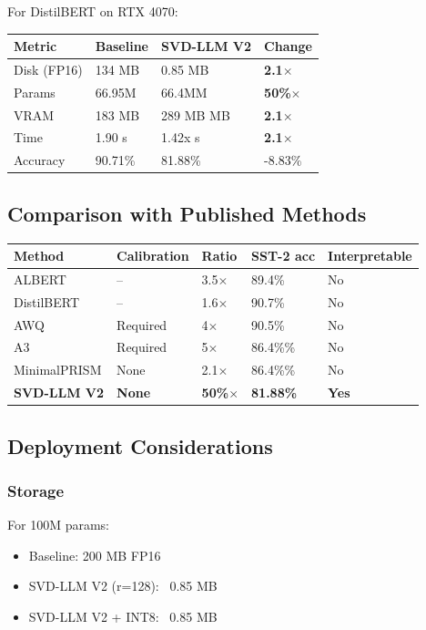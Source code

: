 For DistilBERT on RTX 4070:

\begin{table}[H]
\centering
\small
\begin{tabular}{llll}
\toprule
\textbf{Metric} & \textbf{Baseline} & \textbf{SVD-LLM V2} & \textbf{Change} \\
\midrule
Disk (FP16) & 134 MB & 0.85 MB & \textbf{2.1$\times$} \\
Params & 66.95M & 66.4MM & \textbf{50\%$\times$} \\
VRAM & 183 MB & 289 MB MB & \textbf{2.1$\times$} \\
Time & 1.90 s & 1.42x s & \textbf{2.1$\times$} \\
Accuracy & 90.71\% & 81.88\% & -8.83\% \\
\bottomrule
\end{tabular}
\end{table}

\subsection{Comparison with Published Methods}

\begin{table}[H]
\centering
\small
\begin{tabular}{lllll}
\toprule
\textbf{Method} & \textbf{Calibration} & \textbf{Ratio} & \textbf{SST-2 acc} & \textbf{Interpretable} \\
\midrule
ALBERT & -- & 3.5$\times$ & 89.4\% & No \\
DistilBERT & -- & 1.6$\times$ & 90.7\% & No \\
AWQ & Required & 4$\times$ & 90.5\% & No \\
A3 & Required & 5$\times$ & 86.4\%\% & No \\
MinimalPRISM & None & 2.1$\times$ & 86.4\%\% & No \\
\textbf{SVD-LLM V2} & \textbf{None} & \textbf{50\%$\times$} & \textbf{81.88\%} & \textbf{Yes} \\
\bottomrule
\end{tabular}
\end{table}

\subsection{Deployment Considerations}

\subsubsection{Storage}
For 100M params:
\begin{itemize}
\item Baseline: 200 MB FP16
\item SVD-LLM V2 (r=128): ~0.85 MB
\item SVD-LLM V2 + INT8: ~0.85 MB

\end{itemize}
